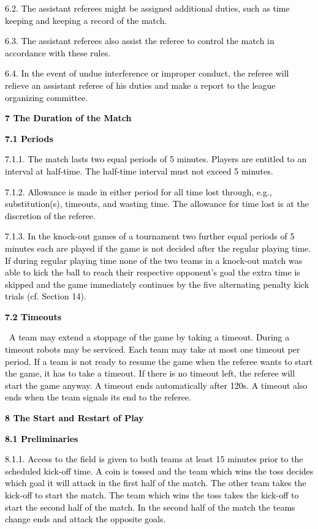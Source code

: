 \documentclass[a4paper]{article}
\begin{document}
\textcolor{black}{6.2. The assistant referees might be assigned additional duties, such as time keeping and keeping a
record of the match.}

\textcolor{black}{6.3. The assistant referees also assist the referee to control the match in accordance with these
rules.}

\textcolor{black}{6.4. In the event of undue interference or improper conduct, the referee will relieve an assistant
referee of his duties and make a report to the league organizing committee.}


\bigskip

\textbf{\textcolor{black}{7 The Duration of the Match}}

\textbf{\textcolor{black}{7.1 Periods}}

\textcolor{black}{7.1.1. The match lasts two equal periods of 5 minutes. Players are entitled to an interval at
half-time. The half-time interval must not exceed 5 minutes.}

\textcolor{black}{7.1.2. Allowance is made in either period for all time lost through, e.g., substitution(s), timeouts,
and wasting time. The allowance for time lost is at the discretion of the referee.}

\textcolor{black}{7.1.3. In the knock-out games of a tournament two further equal periods of 5 minutes each are played
if the game is not decided after the regular playing time. If during regular playing time none of the two teams in a
knock-out match was able to kick the ball to reach their respective opponent's goal the extra time is skipped and the
game immediately continues by the five alternating penalty kick trials (cf. Section 14).}

\textbf{\textcolor{black}{7.2 Timeouts}}

\textcolor{black}{\ A team may extend a stoppage of the game by taking a timeout. During a timeout robots may be
serviced. Each team may take at most one timeout per period. If a team is not ready to resume the game when the referee
wants to start the game, it has to take a timeout. If there is no timeout left, the referee will start the game anyway.
A timeout ends automatically after 120s. A timeout also ends when the team signals its end to the referee.}


\bigskip

\textbf{\textcolor{black}{8 The Start and Restart of Play}}

\textbf{\textcolor{black}{8.1 Preliminaries}}

\textcolor{black}{8.1.1. Access to the field is given to both teams at least 15 minutes prior to the scheduled kick-off
time. A coin is tossed and the team which wins the toss decides which goal it will attack in the first half of the
match. The other team takes the kick-off to start the match. The team which wins the toss takes the kick-off to start
the second half of the match. In the second half of the match the teams change ends and attack the opposite goals.}
\end{document}
